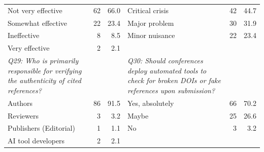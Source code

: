 \begin{table}[htbp]
\begin{threeparttable}
\begin{tabular}{p{6cm}rr|p{6cm}rr}
\rowcolor{tableRowLight}
Not very effective & 62 & 66.0 & Critical crisis & 42 & 44.7 \\
Somewhat effective & 22 & 23.4 & Major problem & 30 & 31.9 \\
\rowcolor{tableRowLight}
Ineffective & 8 & 8.5 & Minor nuisance & 22 & 23.4 \\
Very effective & 2 & 2.1 &  &  &  \\
\midrule
\textit{Q29: Who is primarily responsible for verifying the authenticity of cited references?} & & & \textit{Q30: Should conferences deploy automated tools to check for broken DOIs or fake references upon submission?} & & \\
\rowcolor{tableRowLight}
Authors & 86 & 91.5 & Yes, absolutely & 66 & 70.2 \\
Reviewers & 3 & 3.2 & Maybe & 25 & 26.6 \\
\rowcolor{tableRowLight}
Publishers (Editorial) & 1 & 1.1 & No & 3 & 3.2 \\
AI tool developers & 2 & 2.1 &  &  &  \\
\bottomrule
    \end{tabular}
  \end{threeparttable}
\end{table}

